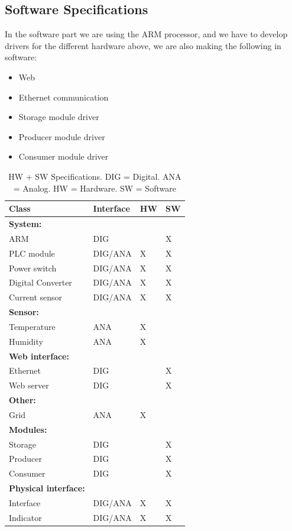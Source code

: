 \subsection{Software Specifications}
In the software part we are using the ARM processor, and we have to develop drivers for the different hardware above, we are also making the following in software:
\begin{itemize}
	\item Web 
	\item Ethernet communication
	\item Storage module driver
	\item Producer module driver
	\item Consumer module driver
\end{itemize}
\begin{table}[H]
	\begin{center}
	\begin{tabular}{| p{5cm}  | p{2.5cm} | p{1cm} | p{1cm} |}
	\hline
		\textbf{Class}					& \textbf{Interface}	& \textbf{HW}	& \textbf{SW}	\\ \hline
		\textbf{System:}					&			&		&		\\ \hline
		ARM							& DIG		&		& X 		\\ \hline
		PLC module					& DIG/ANA	& X		& X 		\\ \hline
		Power switch					& DIG/ANA	& X		& X 		\\ \hline
		Digital Converter				& DIG/ANA	& X		& X 		\\ \hline
		Current sensor					& DIG/ANA	& X		& X 		\\ \hline
		\textbf{Sensor:}					&			&		&		\\ \hline
		Temperature					& ANA		& X		& 	 	\\ \hline
		Humidity						& ANA		& X		& 		\\ \hline
		\textbf{Web interface:}			&			&		&		\\ \hline
		Ethernet						& DIG		& 		& X	 	\\ \hline
		Web server					& DIG		& 		& X		\\ \hline
		\textbf{Other:}					&			&		&		\\ \hline
		Grid							& ANA		& X		& 	 	\\ \hline
		\textbf{Modules:}				&			&		&		\\ \hline
		Storage						& DIG		& 		& X	 	\\ \hline
		Producer						& DIG		& 		& X		\\ \hline
		Consumer					& DIG		& 		& X		\\ \hline
		\textbf{Physical interface:}			&			&		&		\\ \hline
		Interface						& DIG/ANA	& X		& X	 	\\ \hline
		Indicator						& DIG/ANA	& X		& X		\\ \hline
	\end{tabular}
	\caption{HW + SW Specifications. DIG = Digital. ANA = Analog. HW = Hardware. SW = Software}
	\end{center}
\end{table}

